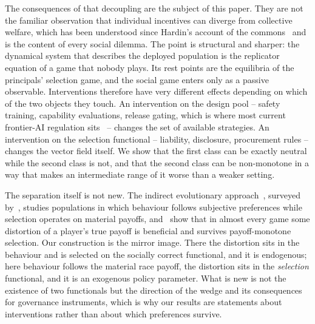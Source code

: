 \documentclass[pdflatex]{sn-jnl}
\theoremstyle{thmstyleone}
\theoremstyle{thmstylethree}
\theoremstyle{thmstyletwo}
\begin{document}
The consequences of that decoupling are the subject of this paper. They are
not the familiar observation that individual incentives can diverge from
collective welfare, which has been understood since Hardin's account of the
commons~\citep{hardin1968tragedy,ostrom1990governing} and is the content of
every social dilemma.
The point is structural and sharper: the dynamical system that describes the
deployed population is the replicator equation of a game that nobody plays.
Its rest points are the equilibria of the principals' selection game, and the
social game enters only as a passive observable. Interventions therefore have
very different effects depending on which of the two objects they touch. An
intervention on the design pool -- safety training, capability evaluations,
release gating, which is where most current frontier-AI regulation
sits~\citep{anderljung2023frontier,euaiact2024} -- changes the set of
available strategies. An intervention on the selection functional --
liability, disclosure, procurement rules -- changes the vector field itself.
We show that the first class can be exactly
neutral while the second class is not, and that the second class can be
non-monotone in a way that makes an intermediate range of it worse than a
weaker setting.

The separation itself is not new. The indirect evolutionary approach~\citep{guth1992evolutionary,guth1995evolutionary,dekel2007evolution,alger2013homo},
surveyed by~\citet{alger2019preference},
studies populations in which behaviour follows subjective preferences while
selection operates on material payoffs, and~\citet{heifetz2007maximize} show
that in almost every game some distortion of a player's true payoff is
beneficial and survives payoff-monotone selection. Our construction is the
mirror image. There the distortion sits in the behaviour and is selected on
the socially correct functional, and it is endogenous; here behaviour follows
the material race payoff, the distortion sits in the \emph{selection}
functional, and it is an exogenous policy parameter. What is new is not the
existence of two functionals but the direction of the wedge and its
consequences for governance instruments, which is why our results are
statements about interventions rather than about which preferences survive.
\end{document}
